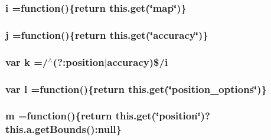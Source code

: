 \subsubsection[{\texorpdfstring{i}{i}}]{ i =function()\{return {\bf this.\+get}(\char`\"{}map\char`\"{})\}}\hypertarget{geolocation-marker_8js_a0325b7ce0988782a8032e720ef3aa411}{}\label{geolocation-marker_8js_a0325b7ce0988782a8032e720ef3aa411}
\subsubsection[{\texorpdfstring{j}{j}}]{ j =function()\{return {\bf this.\+get}(\char`\"{}accuracy\char`\"{})\}}\hypertarget{geolocation-marker_8js_af0ba8fb208a5f5ab73eb0859811a23f8}{}\label{geolocation-marker_8js_af0ba8fb208a5f5ab73eb0859811a23f8}
\subsubsection[{\texorpdfstring{k}{k}}]{\setlength{\rightskip}{0pt plus 5cm}var k =/$^\wedge$(?\+:{\bf position}$\vert$accuracy)\$/{\bf i}}\hypertarget{geolocation-marker_8js_ab26645c014aa005ecedef329ecf58c99}{}\label{geolocation-marker_8js_ab26645c014aa005ecedef329ecf58c99}
\subsubsection[{\texorpdfstring{l}{l}}]{\setlength{\rightskip}{0pt plus 5cm}var l =function()\{return {\bf this.\+get}(\char`\"{}position\+\_\+options\char`\"{})\}}\hypertarget{geolocation-marker_8js_ae5e71a2600e8891c54854be157cc6626}{}\label{geolocation-marker_8js_ae5e71a2600e8891c54854be157cc6626}
\subsubsection[{\texorpdfstring{m}{m}}]{ m =function()\{return {\bf this.\+get}(\char`\"{}position\char`\"{})?this.\+a.\+get\+Bounds()\+:null\}}\hypertarget{geolocation-marker_8js_a35b0c7443f256cec261001a309c77eeb}{}\label{geolocation-marker_8js_a35b0c7443f256cec261001a309c77eeb}
